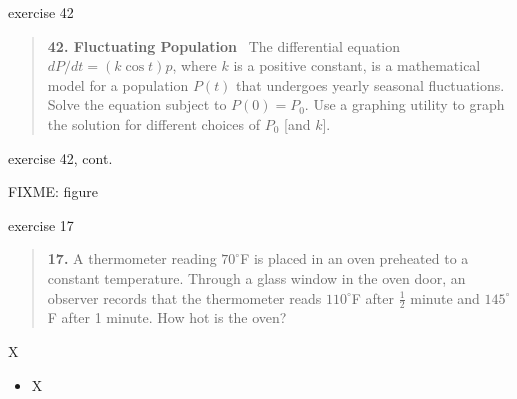 \documentclass{beamer}
\begin{document}
\begin{frame}{exercise 42}

\small
\begin{quotation}
\noindent \textbf{42.  Fluctuating Population} \, The differential equation $dP/dt = (k \cos t) p$, where $k$ is a positive constant, is a mathematical model for a population $P(t)$ that undergoes yearly seasonal fluctuations.  Solve the equation subject to $P(0)=P_0$.  Use a graphing utility to graph the solution for different choices of $P_0$ [and $k$]. 
\end{quotation}

\vspace{45mm}
\end{frame}


\begin{frame}{exercise 42, cont.}

FIXME: figure
\end{frame}


\begin{frame}{exercise 17}

\small
\begin{quotation}
\noindent \textbf{17.} A thermometer reading $70^\circ$F is placed in an oven preheated to a constant temperature.  Through a glass window in the oven door, an observer records that the thermometer reads $110^\circ$F after $\frac{1}{2}$ minute and $145^\circ$F after 1 minute.  How hot is the oven?
\end{quotation}

\vspace{50mm}
\end{frame}


\begin{frame}{X}

\begin{itemize}
\item X
\end{itemize}
\end{frame}
\end{document}
